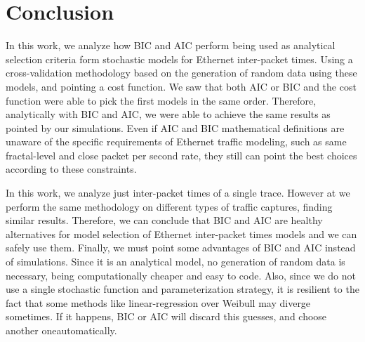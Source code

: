 





\section{Conclusion}

In this work, we analyze how BIC and AIC perform being used as analytical selection criteria form stochastic models for Ethernet inter-packet times. Using a cross-validation methodology based on the generation of random data using these models, and pointing a cost function. We saw that both AIC or BIC and the cost function were able to pick the first models in the same order. Therefore, analytically with BIC and AIC, we were able to achieve the same results as pointed by our simulations. Even if AIC and BIC mathematical definitions are unaware of the specific requirements of Ethernet traffic modeling, such as same fractal-level and close packet per second rate, they still can point the best choices according to these constraints. 

In this work, we analyze just inter-packet times of a single trace. However at \cite{projeto-github} we perform the same methodology on different types of traffic captures, finding similar results. Therefore, we can conclude that BIC and AIC are healthy alternatives for model selection of Ethernet inter-packet times models and we can safely use them. Finally, we must point some advantages of BIC and AIC instead of simulations. Since it is an analytical model, no generation of random data is necessary,  being computationally cheaper and easy to code. Also, since we do not use a single stochastic function and parameterization strategy, it is resilient to the fact that some methods like linear-regression over Weibull may diverge sometimes. If it happens, BIC or AIC will discard this guesses, and choose another oneautomatically.

